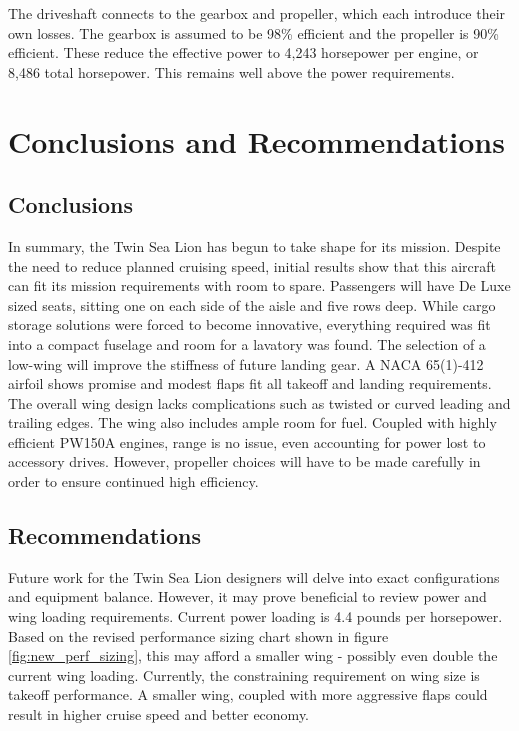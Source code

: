 \documentclass[conf]{new-aiaa}
\begin{document}
The driveshaft connects to the gearbox and propeller, which each introduce their own losses. The gearbox is assumed to be 98\% efficient and the propeller is 90\% efficient. These reduce the effective power to 4,243 horsepower per engine, or 8,486 total horsepower. This remains well above the power requirements.

\section{Conclusions and Recommendations}
\subsection{Conclusions}
In summary, the Twin Sea Lion has begun to take shape for its mission. Despite the need to reduce planned cruising speed, initial results show that this aircraft can fit its mission requirements with room to spare. Passengers will have De Luxe sized seats, sitting one on each side of the aisle and five rows deep. While cargo storage solutions were forced to become innovative, everything required was fit into a compact fuselage and room for a lavatory was found. The selection of a low-wing will improve the stiffness of future landing gear. A NACA 65(1)-412 airfoil shows promise and modest flaps fit all takeoff and landing requirements. The overall wing design lacks complications such as twisted or curved leading and trailing edges. The wing also includes ample room for fuel. Coupled with highly efficient PW150A engines, range is no issue, even accounting for power lost to accessory drives. However, propeller choices will have to be made carefully in order to ensure continued high efficiency.

\subsection{Recommendations}
Future work for the Twin Sea Lion designers will delve into exact configurations and equipment balance. However, it may prove beneficial to review power and wing loading requirements. Current power loading is 4.4 pounds per horsepower. Based on the revised performance sizing chart shown in figure \ref{fig:new_perf_sizing}, this may afford a smaller wing - possibly even double the current wing loading. Currently, the constraining requirement on wing size is takeoff performance. A smaller wing, coupled with more aggressive flaps could result in higher cruise speed and better economy.
\end{document}
